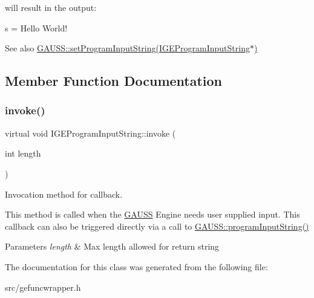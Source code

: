 will result in the output\+: 
\begin{DoxyCode}
s = Hello World!
\end{DoxyCode}


\begin{DoxySeeAlso}{See also}
\hyperlink{class_g_a_u_s_s_ae82b5bfdf26971433c46936a812506c3}{G\+A\+U\+S\+S\+::set\+Program\+Input\+String(\+I\+G\+E\+Program\+Input\+String$\ast$)} 
\end{DoxySeeAlso}


\subsection{Member Function Documentation}
\mbox{\label{class_i_g_e_program_input_string_aff170652d98f6a992a27134a7c674e01}} 
\subsubsection{\texorpdfstring{invoke()}{invoke()}}
{\footnotesize\ttfamily virtual void I\+G\+E\+Program\+Input\+String\+::invoke (\begin{DoxyParamCaption}\item[{int}]{length }\end{DoxyParamCaption})\hspace{0.3cm}{\ttfamily [pure virtual]}}



Invocation method for callback. 

This method is called when the \hyperlink{class_g_a_u_s_s}{G\+A\+U\+SS} Engine needs user supplied input. This callback can also be triggered directly via a call to \hyperlink{class_g_a_u_s_s_afdcb5a64e926589539138da46dc92020}{G\+A\+U\+S\+S\+::program\+Input\+String()}


\begin{DoxyParams}{Parameters}
{\em length} & Max length allowed for return string \\
\hline
\end{DoxyParams}


The documentation for this class was generated from the following file\+:\begin{DoxyCompactItemize}
\item 
src/gefuncwrapper.\+h\end{DoxyCompactItemize}
